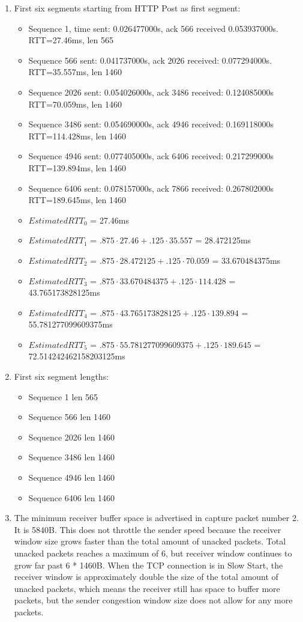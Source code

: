 \documentclass[letter,10pt]{article}
\begin{document}
\begin{enumerate}
	\item First six segments starting from HTTP Post as first segment: 
		\begin{itemize}
			\item Sequence 1, time sent: 0.026477000s, ack 566 received 0.053937000s. RTT=27.46ms, len 565
			\item Sequence 566 sent:  0.041737000s, ack 2026 received: 0.077294000s. RTT=35.557ms, len 1460
			\item Sequence 2026 sent:  0.054026000s, ack 3486 received: 0.124085000s RTT=70.059ms, len 1460
			\item Sequence 3486 sent:  0.054690000s, ack 4946 received: 0.169118000s RTT=114.428ms, len 1460
			\item Sequence 4946 sent:  0.077405000s, ack 6406 received: 0.217299000s RTT=139.894ms, len 1460
			\item Sequence 6406 sent: 0.078157000s, ack 7866 received: 0.267802000s RTT=189.645ms, len 1460
		\end{itemize}
		\begin{itemize}
			\item $EstimatedRTT_0$ = 27.46ms 
			\item $EstimatedRTT_1$ = $.875 \cdot 27.46 + .125 \cdot 35.557$ = 28.472125ms
			\item $EstimatedRTT_2$ = $.875 \cdot 28.472125 + .125 \cdot 70.059$  = 33.670484375ms
			\item $EstimatedRTT_3$ = $.875 \cdot 33.670484375 + .125 \cdot 114.428$ = 43.765173828125ms
			\item $EstimatedRTT_4$ = $.875 \cdot 43.765173828125 + .125 \cdot 139.894$ = 55.781277099609375ms
			\item $EstimatedRTT_5$ = $.875 \cdot 55.781277099609375 + .125 \cdot 189.645$ = 72.514242462158203125ms
		\end{itemize}
	
	\item First six segment lengths:
		\begin{itemize}
			\item Sequence 1 len 565
			\item Sequence 566 len 1460
			\item Sequence 2026 len 1460
			\item Sequence 3486 len 1460
			\item Sequence 4946 len 1460
			\item Sequence 6406 len 1460
		\end{itemize}
	\item The minimum receiver buffer space is advertised in capture packet number 2. It is 5840B. This does not throttle the sender speed because the receiver window size grows faster than the total amount of unacked packets. Total unacked packets reaches a maximum of 6, but receiver window continues to grow far past 6 * 1460B. When the TCP connection is in Slow Start, the receiver window is approximately double the size of the total amount of unacked packets, which means the receiver still has space to buffer more packets, but the sender congestion window size does not allow for any more packets.
	

\end{enumerate}
\end{document}

